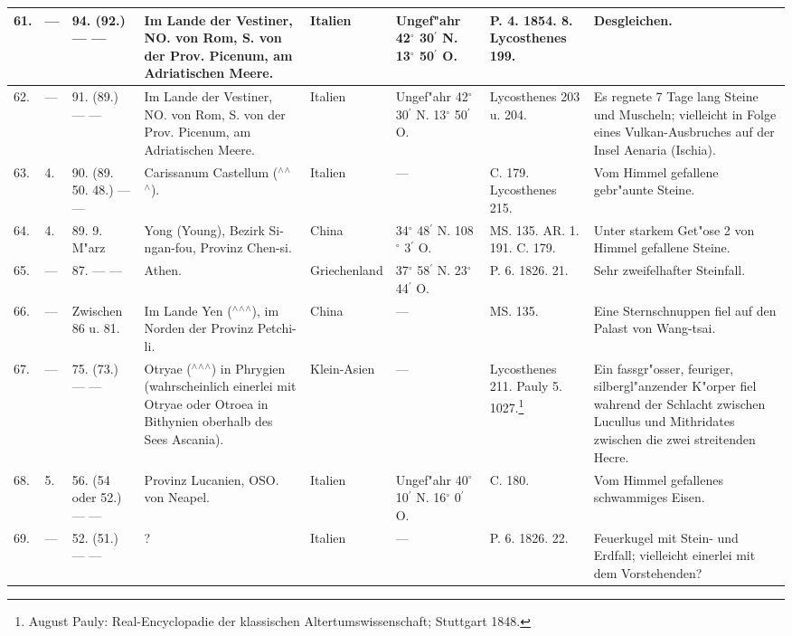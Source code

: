 \documentclass[a4paper, 8pt, oneside, polutonikogreek, german]{article}
\begin{document}
\begin{center}
\begin{longtable}{| p{5mm} | p{3mm} | p{15mm} | p{25mm} | p{20mm} | p{14mm} | p{17mm} | p{24mm} |}
        61. & --- & 94. (92.) --- --- & Im Lande der Vestiner, NO. von Rom, S. von der Prov. Picenum, am Adriatischen Meere. & Italien & Ungef"ahr 42$^\circ$ 30$^\prime$ N. 13$^\circ$ 50$^\prime$ O. & P. 4. 1854. 8. Lycosthenes 199. & Desgleichen. \\ \hline
        62. & --- & 91. (89.) --- --- & Im Lande der Vestiner, NO. von Rom, S. von der Prov. Picenum, am Adriatischen Meere. & Italien & Ungef"ahr 42$^\circ$ 30$^\prime$ N. 13$^\circ$ 50$^\prime$ O. & Lycosthenes 203 u. 204. & Es regnete 7 Tage lang Steine und Muscheln; vielleicht in Folge eines Vulkan-Ausbruches auf der Insel Aenaria (Ischia). \\ \hline
        63. & 4. & 90. (89. 50. 48.) --- --- & Carissanum Castellum ($^\wedge$$^\wedge$$^\wedge$). & Italien & --- & C. 179. Lycosthenes 215. & Vom Himmel gefallene gebr"aunte Steine. \\ \hline
        64. & 4. & 89. 9. M"arz & Yong (Young), Bezirk Si-ngan-fou, Provinz Chen-si. & China & 34$^\circ$ 48$^\prime$ N. 108$^\circ$ 3$^\prime$ O. & MS. 135. AR. 1. 191. C. 179. & Unter starkem Get"ose 2 von Himmel gefallene Steine. \\ \hline
        65. & --- & 87. --- --- & Athen. & Griechenland & 37$^\circ$ 58$^\prime$ N. 23$^\circ$ 44$^\prime$ O. & P. 6. 1826. 21. & Sehr zweifelhafter Steinfall. \\ \hline
        66. & --- & Zwischen 86 u. 81. & Im Lande Yen ($^\wedge$$^\wedge$$^\wedge$), im Norden der Provinz Petchi-li. & China & --- & MS. 135. & Eine Sternschnuppen fiel auf den Palast von Wang-tsai. \\ \hline
        67. & --- & 75. (73.) --- --- & Otryae ($^\wedge$$^\wedge$$^\wedge$) in Phrygien (wahrscheinlich einerlei mit Otryae oder Otroea in Bithynien oberhalb des Sees Ascania). & Klein-Asien & --- & Lycosthenes 211. Pauly 5. 1027.\footnote{August Pauly: Real-Encyclopadie der klassischen Altertumswissenschaft; Stuttgart 1848.} & Ein fassgr"osser, feuriger, silbergl"anzender K"orper fiel wahrend der Schlacht zwischen Lucullus und Mithridates zwischen die zwei streitenden Hecre. \\ \hline
        68. & 5. & 56. (54 oder 52.) --- --- & Provinz Lucanien, OSO. von Neapel. & Italien & Ungef"ahr 40$^\circ$ 10$^\prime$ N. 16$^\circ$ 0$^\prime$ O. & C. 180. & Vom Himmel gefallenes schwammiges Eisen. \\ \hline
        69. & --- & 52. (51.) --- --- & ? & Italien & --- & P. 6. 1826. 22. & Feuerkugel mit Stein- und Erdfall; vielleicht einerlei mit dem Vorstehenden? \\ \hline

\end{longtable}
\end{center}
\end{document}

